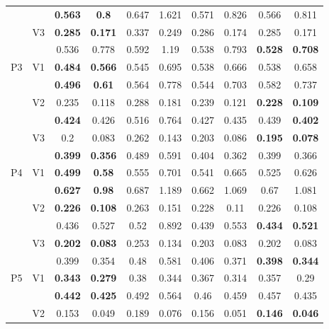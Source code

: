 \documentclass[12pt,a4paper]{article}
\begin{document}
\begin{sidewaystable}[ht]
{\begin{tabular}{cc|cc|cc|cc|cc|}
   &  & \textbf{0.563} & \textbf{0.8} & 0.647 & 1.621 & 0.571 & 0.826 & 0.566 & 0.811 \\ 
   & \multirow{2}{*}{V3} & \textbf{0.285} & \textbf{0.171} & 0.337 & 0.249 & 0.286 & 0.174 & 0.285 & 0.171 \\ 
   &  & 0.536 & 0.778 & 0.592 & 1.19 & 0.538 & 0.793 & \textbf{0.528} & \textbf{0.708} \\ 
   \hline \hline\multirow{6}{*}{P3} & \multirow{2}{*}{V1} & \textbf{0.484} & \textbf{0.566} & 0.545 & 0.695 & 0.538 & 0.666 & 0.538 & 0.658 \\ 
   &  & \textbf{0.496} & \textbf{0.61} & 0.564 & 0.778 & 0.544 & 0.703 & 0.582 & 0.737 \\ 
   & \multirow{2}{*}{V2} & 0.235 & 0.118 & 0.288 & 0.181 & 0.239 & 0.121 & \textbf{0.228} & \textbf{0.109} \\ 
   &  & \textbf{0.424} & 0.426 & 0.516 & 0.764 & 0.427 & 0.435 & 0.439 & \textbf{0.402} \\ 
   & \multirow{2}{*}{V3} & 0.2 & 0.083 & 0.262 & 0.143 & 0.203 & 0.086 & \textbf{0.195} & \textbf{0.078} \\ 
   &  & \textbf{0.399} & \textbf{0.356} & 0.489 & 0.591 & 0.404 & 0.362 & 0.399 & 0.366 \\ 
   \hline \hline\multirow{6}{*}{P4} & \multirow{2}{*}{V1} & \textbf{0.499} & \textbf{0.58} & 0.555 & 0.701 & 0.541 & 0.665 & 0.525 & 0.626 \\ 
   &  & \textbf{0.627} & \textbf{0.98} & 0.687 & 1.189 & 0.662 & 1.069 & 0.67 & 1.081 \\ 
   & \multirow{2}{*}{V2} & \textbf{0.226} & \textbf{0.108} & 0.263 & 0.151 & 0.228 & 0.11 & 0.226 & 0.108 \\ 
   &  & 0.436 & 0.527 & 0.52 & 0.892 & 0.439 & 0.553 & \textbf{0.434} & \textbf{0.521} \\ 
   & \multirow{2}{*}{V3} & \textbf{0.202} & \textbf{0.083} & 0.253 & 0.134 & 0.203 & 0.083 & 0.202 & 0.083 \\ 
   &  & 0.399 & 0.354 & 0.48 & 0.581 & 0.406 & 0.371 & \textbf{0.398} & \textbf{0.344} \\ 
   \hline \hline\multirow{6}{*}{P5} & \multirow{2}{*}{V1} & \textbf{0.343} & \textbf{0.279} & 0.38 & 0.344 & 0.367 & 0.314 & 0.357 & 0.29 \\ 
   &  & \textbf{0.442} & \textbf{0.425} & 0.492 & 0.564 & 0.46 & 0.459 & 0.457 & 0.435 \\ 
   & \multirow{2}{*}{V2} & 0.153 & 0.049 & 0.189 & 0.076 & 0.156 & 0.051 & \textbf{0.146} & \textbf{0.046} \\ 

\end{tabular}}
\end{sidewaystable}
\end{document}
